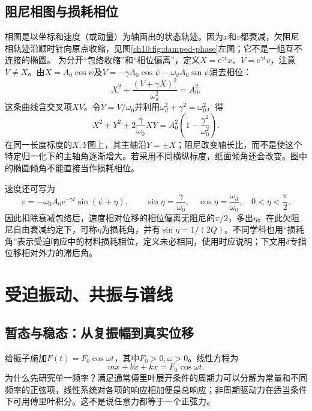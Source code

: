 \subsection{阻尼相图与损耗相位}
相图是以坐标和速度（或动量）为轴画出的状态轨迹。因为$x$和$v$都衰减，欠阻尼相轨迹沿顺时针向原点收缩，见图\ref{ch10:fig:damped-phase}左图；它不是一组互不连接的椭圆。
\chTenDampedPhaseFigure
为分开“包络收缩”和“相位偏离”，定义$X=\mathrm e^{\gamma t}x$、$V=\mathrm e^{\gamma t}v$，注意$V\ne\dot X$。由$X=A_0\cos\psi$及$V=-\gamma A_0\cos\psi-\omega_d A_0\sin\psi$消去相位：
\begin{equation}\label{ch10:eq:tilted}
 X^2+\frac{(V+\gamma X)^2}{\omega_d^2}=A_0^2.
\end{equation}
这条曲线含交叉项$XV$。令$Y=V/\omega_0$并利用$\omega_d^2+\gamma^2=\omega_0^2$，得
\[
 X^2+Y^2+2\frac\gamma{\omega_0}XY
 =A_0^2\left(1-\frac{\gamma^2}{\omega_0^2}\right).
\]
在同一长度标度的$X,Y$图上，其主轴沿$Y=\pm X$；阻尼改变轴长比，而不是使这个特定归一化下的主轴角逐渐增大。若采用不同横纵标度，纸面倾角还会改变。图中的椭圆倾角不能直接当作损耗相位。

速度还可写为
\[
 v=-\omega_0A_0\mathrm e^{-\gamma t}\sin(\psi+\eta),\qquad
 \sin\eta=\frac\gamma{\omega_0},\quad
 \cos\eta=\frac{\omega_d}{\omega_0},\quad0<\eta<\frac\pi2.
\]
因此扣除衰减包络后，速度相对位移的相位偏离无阻尼的$\pi/2$，多出$\eta$。在此欠阻尼自由衰减约定下，可称$\eta$为损耗角，并有$\sin\eta=1/(2Q)$。不同学科也用“损耗角”表示受迫响应中的材料损耗相位，定义未必相同，使用时应说明；下文用$\delta$专指位移相对外力的滞后角。

\section{受迫振动、共振与谱线}\label{ch10:sec:driven}
\subsection{暂态与稳态：从复振幅到真实位移}
给振子施加$F(t)=F_0\cos\omega t$，其中$F_0>0,\omega>0$。线性方程为
\begin{equation}\label{ch10:eq:forced}
 m\ddot x+b\dot x+kx=F_0\cos\omega t.
\end{equation}
为什么先研究单一频率？满足通常傅里叶展开条件的周期力可以分解为常量和不同频率的正弦项，线性系统对各项的响应相加便是总响应；非周期驱动力在适当条件下可用傅里叶积分。这不是说任意力都等于一个正弦力。

